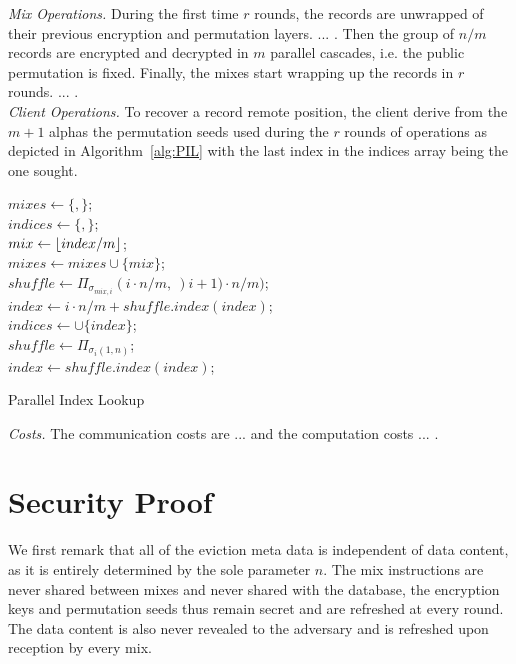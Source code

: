 \documentclass[USenglish,oneside,twocolumn]{article}
\DeclarePairedDelimiter\floor{\lfloor}{\rfloor}
\begin{document}
\noindent\textit{Mix Operations.} During the first time $r$ rounds, the records are unwrapped of their previous encryption and permutation layers. ... . Then the group of $n/m$ records are encrypted and decrypted in $m$ parallel cascades, i.e. the public permutation is fixed. Finally, the mixes start wrapping up the records in $r$ rounds. ... . \\

\noindent\textit{Client Operations.} To recover a record remote position, the client derive from the $m+1$ alphas the permutation seeds used during the $r$ rounds of operations as depicted in Algorithm~\ref{alg:PIL} with the last index in the indices array being the one sought.\\

\begin{algorithm}
\DontPrintSemicolon
{}
$mixes \gets \{,\}$;\\
$indices \gets \{,\}$;\\
{
	$mix \gets \floor{index/m}$;\\
	$mixes \gets mixes \cup \{mix \}$;\\
	$shuffle \gets {\Pi}_{\sigma_{mix,i}}(i\cdot n / m,\ )i+1)\cdot n / m)$;\\
	$index \gets i\cdot n/m + shuffle.index(index)$;\\
	$indices \gets \cup \{index\}$;\\
	$shuffle \gets {\Pi}_{\sigma_{i}(1,n)}$;\\
	$index \gets shuffle.index(index)$;\\
}
\caption{Parallel Index Lookup}
\label{alg:PIL}
\end{algorithm}

\noindent\textit{Costs.} The communication costs are ... and the computation costs ... .\\

\section{Security Proof}\label{Security}

We first remark that all of the eviction meta data is independent of data content, as it is entirely determined by the sole parameter $n$. The mix instructions are never shared between mixes and never shared with the database, the encryption keys and permutation seeds thus remain secret and are refreshed at every round. The data content is also never revealed to the adversary and is refreshed upon reception by every mix.
\end{document}
